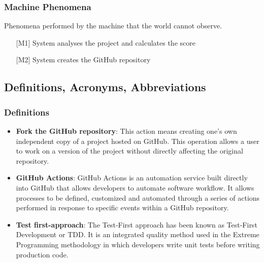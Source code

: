 \vspace{0.5\baselineskip}
\subsubsection{Machine Phenomena}
Phenomena performed by the machine that the world cannot observe.
\begin{itemize}
    \setlength{\itemsep}{0pt}
    \setlength{\parskip}{0pt}
    \setlength{\parsep}{0pt}
    \setlength{\partopsep}{0pt}
    \setlength{\topsep}{0pt}
    \item [{[M1]}] System analyses the project and calculates the score
    \item [{[M2]}] System creates the GitHub repository
\end{itemize}




\vspace{1\baselineskip}
\subsection{Definitions, Acronyms, Abbreviations}


\vspace{0.5\baselineskip}
\subsubsection{Definitions}
\begin{itemize}
    \item \textbf{Fork the GitHub repository}: This action means creating one's own independent copy of a project hosted on GitHub. This operation allows a user to work on a version of the project without directly affecting the original repository.
    \item \textbf{GitHub Actions}: GitHub Actions is an automation service built directly into GitHub that allows developers to automate software workflow. It allows processes to be defined, customized and automated through a series of actions performed in response to specific events within a GitHub repository.
    \item \textbf{Test first-approach}: The Test-First approach has been known as Test-First Development or TDD. It is an integrated quality method used in the Extreme Programming methodology in which developers write unit tests before writing production code.
\end{itemize}

\vspace{0.5\baselineskip}
